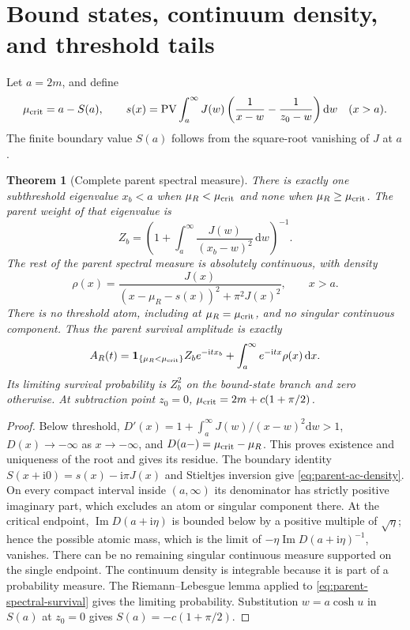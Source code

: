 \documentclass[11pt,a4paper,oneside]{book}
\theoremstyle{plain}
\newtheorem{theorem}{Theorem}[chapter]
\theoremstyle{definition}
\theoremstyle{remark}
\newcommand{\dd}{\mathrm d}
\newcommand{\ii}{\mathrm i}
\newcommand{\src}[2]{\cite{#1}}
\begin{document}
\section{Bound states, continuum density, and threshold tails}
\label{sec:parent-spectrum}
Let $a=2m$, and define
\begin{equation}
 \mu_{\rm crit}=a-S(a),\qquad
 s(x)=\operatorname{PV}\int_a^\infty J(w)
       \left(\frac1{x-w}-\frac1{z_0-w}\right)\dd w
       \quad(x>a).
 \label{eq:parent-critical-parameter}
\end{equation}
The finite boundary value $S(a)$ follows from the square-root vanishing
of $J$ at $a$.

\begin{theorem}[Complete parent spectral measure]
\label{thm:parent-spectral-measure}
There is exactly one subthreshold eigenvalue $x_b<a$ when
$\mu_R<\mu_{\rm crit}$ and none when $\mu_R\ge\mu_{\rm crit}$.
The parent weight of that eigenvalue is
\begin{equation}
 Z_b=\left(1+\int_a^\infty\frac{J(w)}{(x_b-w)^2}\,\dd w\right)^{-1}.
 \label{eq:parent-bound-weight}
\end{equation}
The rest of the parent spectral measure is absolutely continuous,
with density
\begin{equation}
 \rho(x)=\frac{J(x)}{(x-\mu_R-s(x))^2+\pi^2J(x)^2},\qquad x>a.
 \label{eq:parent-ac-density}
\end{equation}
There is no threshold atom, including at $\mu_R=\mu_{\rm crit}$,
and no singular continuous component.  Thus the parent survival
amplitude is exactly
\begin{equation}
 A_R(t)=\mathbf1_{\{\mu_R<\mu_{\rm crit}\}}Z_be^{-\ii tx_b}
                   +\int_a^\infty e^{-\ii tx}\rho(x)\,\dd x.
 \label{eq:parent-spectral-survival}
\end{equation}
Its limiting survival probability is $Z_b^2$ on the bound-state branch
and zero otherwise.  At subtraction point $z_0=0$,
$\mu_{\rm crit}=2m+c(1+\pi/2)$.
\end{theorem}
\begin{proof}
Below threshold,
$D'(x)=1+\int_a^\infty J(w)/(x-w)^2\dd w>1$,
$D(x)\to-\infty$ as $x\to-\infty$, and
$D(a-)=\mu_{\rm crit}-\mu_R$.  This proves existence and uniqueness
of the root and gives its residue.  The boundary identity
$S(x+\ii0)=s(x)-\ii\pi J(x)$ and Stieltjes inversion give
\eqref{eq:parent-ac-density}.  On every compact interval inside
$(a,\infty)$ its denominator has strictly positive imaginary part,
which excludes an atom or singular component there.  At the critical
endpoint, $\operatorname{Im}D(a+\ii\eta)$ is bounded below by a
positive multiple of $\sqrt\eta$; hence the possible atomic mass,
which is the limit of $-\eta\operatorname{Im}D(a+\ii\eta)^{-1}$,
vanishes.  There can be no remaining singular continuous measure
supported on the single endpoint.  The continuum density is integrable
because it is part of a probability measure.  The Riemann--Lebesgue
lemma applied to \eqref{eq:parent-spectral-survival} gives the limiting
probability.  Substitution $w=a\cosh u$ in $S(a)$ at $z_0=0$ gives
$S(a)=-c(1+\pi/2)$.
\end{proof}
\src{R20}{thm:v20v48-bound,thm:v20v48-ac,thm:v20v48-noatom,cor:v20v48-survival,prop:v20v48-explicit}
\end{document}
